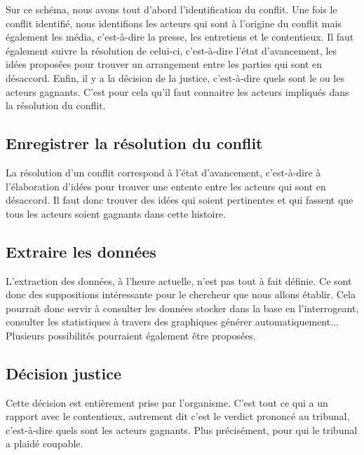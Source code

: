 \documentclass[12pt,a4paper]{article}
\newcommand{\sommaire}{\shorttoc{Sommaire}{2}}
\begin{document}
Sur ce schéma, nous avons tout d'abord l'identification du conflit. Une fois le conflit identifié, nous identifions les acteurs qui sont à l'origine du conflit mais également les média, c'est-à-dire la presse, les entretiens et le contentieux. Il faut également suivre la résolution de celui-ci, c'est-à-dire l'état d'avancement, les idées proposées pour trouver un arrangement entre les parties qui sont en désaccord. Enfin, il y a la décision de la justice, c'est-à-dire quels sont le ou les acteurs gagnants. C'est pour cela qu'il faut connaitre les acteurs impliqués dans la résolution du conflit.

\subsection{Enregistrer la résolution du conflit}
La résolution d'un conflit correspond à l'état d'avancement, c'est-à-dire à l'élaboration d'idées pour trouver une entente entre les acteurs qui sont en désaccord. Il faut donc trouver des idées qui soient pertinentes et qui fassent que tous les acteurs soient gagnants dans cette histoire.

\subsection{Extraire les données}
L'extraction des données, à l'heure actuelle, n'est pas tout à fait définie. Ce sont donc des suppositions intéressante pour le chercheur que nous allons établir. Cela pourrait donc servir à consulter les données stocker dans la base en l'interrogeant, consulter les statistiques à travers des graphiques générer automatiquement... Plusieurs possibilités pourraient également être proposées.

\subsection{Décision justice}
Cette décision est entièrement prise par l'organisme. C'est tout ce qui a un rapport avec le contentieux, autrement dit c'est le verdict prononcé au tribunal, c'est-à-dire quels sont les acteurs gagnants. Plus précisément, pour qui le tribunal a plaidé coupable.



\end{document}
